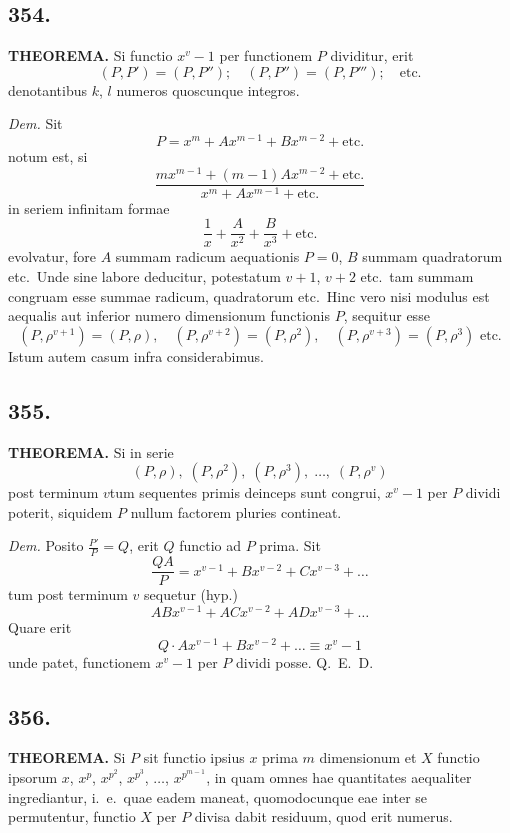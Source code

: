 \documentclass[12pt]{article}
\begin{document}
\subsection*{354.}

\textbf{THEOREMA.} Si functio $x^v-1$ per functionem $P$ dividitur, erit
\[
(P,P')=(P,P'');\quad (P,P'')=(P,P''');\quad \text{etc.}
\]
denotantibus $k$, $l$ numeros quoscunque integros.

\textit{Dem.} Sit
\[
P = x^m + Ax^{m-1} + Bx^{m-2} + \text{etc.}
\]
notum est, si
\[
\frac{mx^{m-1}+(m-1)Ax^{m-2}+\text{etc.}}{x^m+Ax^{m-1}+\text{etc.}}
\]
in seriem infinitam formae
\[
\frac{1}{x}+\frac{A}{x^2}+\frac{B}{x^3}+\text{etc.}
\]
evolvatur, fore $A$ summam radicum aequationis $P=0$, $B$ summam quadratorum etc.~Unde sine labore deducitur, potestatum $v+1$, $v+2$ etc.~tam summam congruam esse summae radicum, quadratorum etc.~Hinc vero nisi modulus est aequalis aut inferior numero dimensionum functionis $P$, sequitur esse
\[
(P,\rho^{v+1})=(P,\rho),\quad (P,\rho^{v+2})=(P,\rho^2),\quad (P,\rho^{v+3})=(P,\rho^3) \text{ etc.}
\]
Istum autem casum infra considerabimus.

\subsection*{355.}

\textbf{THEOREMA.} Si in serie
\[
(P,\rho),\; (P,\rho^2),\; (P,\rho^3),\; \ldots,\; (P,\rho^v)
\]
post terminum $v$tum sequentes primis deinceps sunt congrui, $x^v-1$ per $P$ dividi poterit, siquidem $P$ nullum factorem pluries contineat.

\textit{Dem.} Posito $\frac{P'}{P}=Q$, erit $Q$ functio ad $P$ prima. Sit
\[
\frac{QA}{P}=x^{v-1}+Bx^{v-2}+Cx^{v-3}+\ldots
\]
tum post terminum $v$ sequetur (hyp.)
\[
ABx^{v-1}+ACx^{v-2}+ADx^{v-3}+\ldots
\]
Quare erit
\[
Q\cdot Ax^{v-1} + Bx^{v-2} + \ldots \equiv x^v-1
\]
unde patet, functionem $x^v-1$ per $P$ dividi posse. Q.~E.~D.

\subsection*{356.}

\textbf{THEOREMA.} Si $P$ sit functio ipsius $x$ prima $m$ dimensionum et $X$ functio ipsorum $x$, $x^p$, $x^{p^2}$, $x^{p^3}$, $\ldots$, $x^{p^{m-1}}$, in quam omnes hae quantitates aequaliter ingrediantur, i.~e.~quae eadem maneat, quomodocunque eae inter se permutentur, functio $X$ per $P$ divisa dabit residuum, quod erit numerus.
\end{document}
